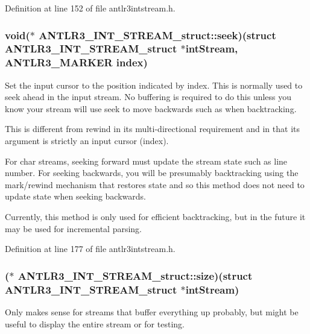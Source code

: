 Definition at line 152 of file antlr3intstream.\-h.

\hypertarget{struct_a_n_t_l_r3___i_n_t___s_t_r_e_a_m__struct_a052f31580e00cb4200a6234dfcca600b}{
\subsubsection[{seek}]{\setlength{\rightskip}{0pt plus 5cm}void($\ast$ A\-N\-T\-L\-R3\-\_\-\-I\-N\-T\-\_\-\-S\-T\-R\-E\-A\-M\-\_\-struct\-::seek)(struct {\bf A\-N\-T\-L\-R3\-\_\-\-I\-N\-T\-\_\-\-S\-T\-R\-E\-A\-M\-\_\-struct} $\ast$int\-Stream, {\bf A\-N\-T\-L\-R3\-\_\-\-M\-A\-R\-K\-E\-R} {\bf index})}}\label{struct_a_n_t_l_r3___i_n_t___s_t_r_e_a_m__struct_a052f31580e00cb4200a6234dfcca600b}
Set the input cursor to the position indicated by index. This is normally used to seek ahead in the input stream. No buffering is required to do this unless you know your stream will use seek to move backwards such as when backtracking.

This is different from rewind in its multi-\/directional requirement and in that its argument is strictly an input cursor (index).

For char streams, seeking forward must update the stream state such as line number. For seeking backwards, you will be presumably backtracking using the mark/rewind mechanism that restores state and so this method does not need to update state when seeking backwards.

Currently, this method is only used for efficient backtracking, but in the future it may be used for incremental parsing. 

Definition at line 177 of file antlr3intstream.\-h.

\hypertarget{struct_a_n_t_l_r3___i_n_t___s_t_r_e_a_m__struct_a0b98371dec207f65b25d8d65e05ebac3}{
\subsubsection[{size}]{($\ast$ A\-N\-T\-L\-R3\-\_\-\-I\-N\-T\-\_\-\-S\-T\-R\-E\-A\-M\-\_\-struct\-::size)(struct {\bf A\-N\-T\-L\-R3\-\_\-\-I\-N\-T\-\_\-\-S\-T\-R\-E\-A\-M\-\_\-struct} $\ast$int\-Stream)}}\label{struct_a_n_t_l_r3___i_n_t___s_t_r_e_a_m__struct_a0b98371dec207f65b25d8d65e05ebac3}
Only makes sense for streams that buffer everything up probably, but might be useful to display the entire stream or for testing. 

